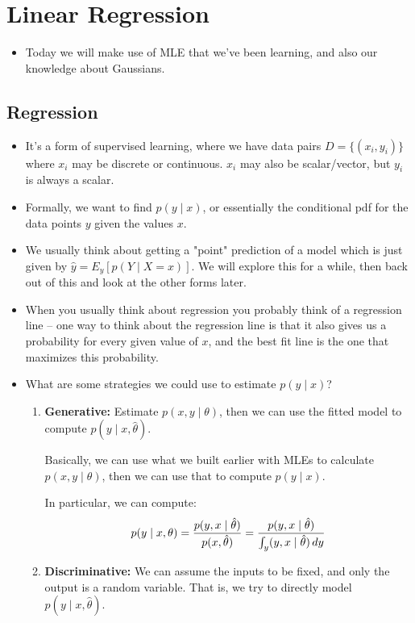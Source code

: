 \section{Linear Regression}
\begin{itemize}
	\item Today we will make use of MLE that we've been learning, and also our
		knowledge about Gaussians.
\end{itemize}
\subsection{Regression}
\begin{itemize}
	\item It's a form of supervised learning, where we have data pairs \( D = \{(x_i,
		y_i)\} \) where \( x_i \) may be discrete or continuous. \( x_i \) may also
		be scalar/vector, but \( y_i \) is always a scalar.  
	\item Formally, we want to find \( p(y \mid x) \), or essentially the conditional
		pdf for the data points \( y \) given the values \( x \). 
	\item We usually think about getting a "point" prediction of a model which is
		just given by \( \hat{y} = E_y[p(Y \mid X = x)] \). We will explore this for
		a while, then back out of this and look at the other forms later.
	\item When you usually think about regression you probably think of a regression
		line -- one way to think about the regression line is that it also gives us a
		probability for every given value of \( x \), and the best fit line is the
		one that maximizes this probability.  
	\item What are some strategies we could use to estimate \( p(y \mid x) \)? 
		\begin{enumerate}[label=\arabic*.]
			\item \textbf{Generative:} Estimate \( p(x, y \mid \theta) \), then we can use the fitted
				model to compute \( p(y \mid x, \hat{\theta}) \). 

				Basically, we can use what we built earlier with MLEs to calculate \(
				p(x, y \mid \theta)\), then we can use that to compute \( p(y \mid x)
				\). 


				In particular, we can compute:
				\[
					p(y \mid x, \theta) = \frac{p(y, x \mid \hat{\theta})}{p(x,
					\hat{\theta})} = \frac{p(y, x \mid \hat{\theta})}{\int_y (y,
				x \mid \hat{\theta}) \,d y}
				\]

			\item \textbf{Discriminative:} We can assume the inputs to be fixed, and only the output is a
				random variable. That is, we try to directly model \( p(y \mid x,
				\hat{\theta}) \). 


\end{enumerate}
\end{itemize}
